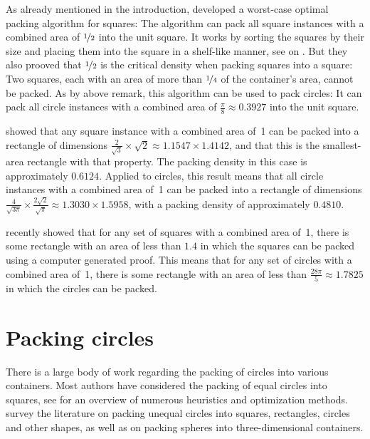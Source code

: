 \documentclass[a4paper,style=print,oneside,bibliography=totoc,nexus,lnum,extramargin]{tubsbook}
\begin{document}
As already mentioned in the introduction, \textcite{MM1967some} developed a worst-case optimal packing algorithm for squares: The algorithm can pack all square instances with a combined area of $\nicefrac{1}{2}$ into the unit square.
It works by sorting the squares by their size and placing them into the square in a shelf-like manner, see  on .
But they also prooved that $\nicefrac{1}{2}$ is the critical density when packing squares into a square: Two squares, each with an area of more than $\nicefrac{1}{4}$ of the container's area, cannot be packed.
As by above remark, this algorithm can be used to pack circles: It can pack all circle instances with a combined area of $\frac{\pi}{8} \approx 0.3927$ into the unit square.

\textcite{KK1975optimal} showed that any square instance with a combined area of~1 can be packed into a rectangle of dimensions $\frac{2}{\sqrt{3}} \times \sqrt{2} \approx 1.1547 \times 1.4142$, and that this is the smallest-area rectangle with that property. The packing density in this case is approximately $0.6124$. Applied to circles, this result means that all circle instances with a combined area of~1 can be packed into a rectangle of dimensions $\frac{4}{\sqrt{3\pi}} \times \frac{2\sqrt{2}}{\sqrt{\pi}} \approx 1.3030 \times 1.5958$, with a packing density of approximately $0.4810$.

\textcite{hougardy2011packing} recently showed that for any set of squares with a combined area of~1, there is some rectangle with an area of less than $1.4$ in which the squares can be packed using a computer generated proof. This means that for any set of circles with a combined area of~1, there is some rectangle with an area of less than $\frac{28\pi}{5} \approx 1.7825$ in which the circles can be packed.

\section{Packing circles}

There is a large body of work regarding the packing of circles into various containers. Most authors have considered the packing of equal circles into squares, see \textcite{SMCSCG2007new} for an overview of numerous heuristics and optimization methods. \textcite{HM2009literature} survey the literature on packing unequal circles into squares, rectangles, circles and other shapes, as well as on packing spheres into three-dimensional containers.
\end{document}
